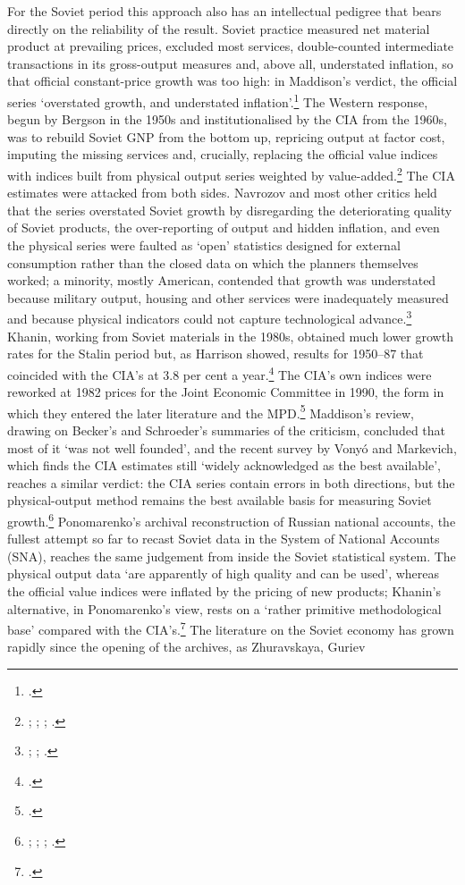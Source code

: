 For the Soviet period this approach also has an intellectual pedigree that bears directly on the reliability of the result. Soviet practice measured net material product at prevailing prices, excluded most services, double-counted intermediate transactions in its gross-output measures and, above all, understated inflation, so that official constant-price growth was too high: in Maddison's verdict, the official series `overstated growth, and understated inflation'.\footnote{\autocite[307]{Maddison1998b}.} The Western response, begun by Bergson in the 1950s and institutionalised by the CIA from the 1960s, was to rebuild Soviet GNP from the bottom up, repricing output at factor cost, imputing the missing services and, crucially, replacing the official value indices with indices built from physical output series weighted by value-added.\footnote{\autocite{bergson1950}; \autocite{bergson1961}; \autocite[48]{cia1982a}; \autocite{Maddison1995a}.} The CIA estimates were attacked from both sides. Navrozov and most other critics held that the series overstated Soviet growth by disregarding the deteriorating quality of Soviet products, the over-reporting of output and hidden inflation, and even the physical series were faulted as `open' statistics designed for external consumption rather than the closed data on which the planners themselves worked; a minority, mostly American, contended that growth was understated because military output, housing and other services were inadequately measured and because physical indicators could not capture technological advance.\footnote{\autocite{assessingCIA1988}; \autocite{becker1994}; \autocite{schroeder1995}.} Khanin, working from Soviet materials in the 1980s, obtained much lower growth rates for the Stalin period but, as Harrison showed, results for 1950--87 that coincided with the CIA's at 3.8 per cent a year.\footnote{\autocite[144, 146]{harrison1993}.} The CIA's own indices were reworked at 1982 prices for the Joint Economic Committee in 1990, the form in which they entered the later literature and the MPD.\footnote{\autocite{cia1990}.} Maddison's review, drawing on Becker's and Schroeder's summaries of the criticism, concluded that most of it `was not well founded', and the recent survey by Vonyó and Markevich, which finds the CIA estimates still `widely acknowledged as the best available', reaches a similar verdict: the CIA series contain errors in both directions, but the physical-output method remains the best available basis for measuring Soviet growth.\footnote{\autocite{becker1994}; \autocite{schroeder1995}; \autocite[309]{Maddison1998b}; \autocite[279--80]{vonyoinmorys2021}.} Ponomarenko's archival reconstruction of Russian national accounts, the fullest attempt so far to recast Soviet data in the System of National Accounts (SNA), reaches the same judgement from inside the Soviet statistical system. The physical output data `are apparently of high quality and can be used', whereas the official value indices were inflated by the pricing of new products; Khanin's alternative, in Ponomarenko's view, rests on a `rather primitive methodological base' compared with the CIA's.\footnote{\autocite[16--18, 73--4]{ponomarenko2002}.} The literature on the Soviet economy has grown rapidly since the opening of the archives, as Zhuravskaya, Guriev 
